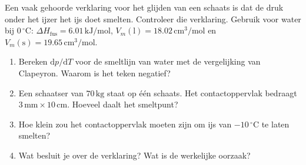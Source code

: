 \begin{oefening}
Een vaak gehoorde verklaring voor het glijden van een schaats is dat de druk onder het ijzer het ijs doet smelten. Controleer die verklaring. Gebruik voor water bij \(0\,^\circ\mathrm{C}\): \(\Delta H_{\text{fus}} = 6.01\,\mathrm{kJ/mol}\), \(V_m(\mathrm{l}) = 18.02\,\mathrm{cm^3/mol}\) en \(V_m(\mathrm{s}) = 19.65\,\mathrm{cm^3/mol}\).

\begin{enumerate}
\item[(a)]
  Bereken \(\mathrm{d}p/\mathrm{d}T\) voor de smeltlijn van water met de vergelijking van Clapeyron. Waarom is het teken negatief?
\item[(b)]
  Een schaatser van \(70\,\mathrm{kg}\) staat op één schaats. Het contactoppervlak bedraagt \(3\,\mathrm{mm} \times 10\,\mathrm{cm}\). Hoeveel daalt het smeltpunt?
\item[(c)]
  Hoe klein zou het contactoppervlak moeten zijn om ijs van \(-10\,^\circ\mathrm{C}\) te laten smelten?
\item[(d)]
  Wat besluit je over de verklaring? Wat is de werkelijke oorzaak?
\end{enumerate}
\end{oefening}
